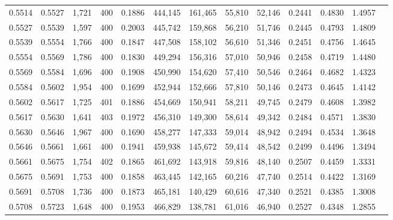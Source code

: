 \begin{tabular}{rrrrrrrrrrrrr}
0.5514 & 0.5527 &  1,721 & 400 &                                     0.1886 & 444,145 & 161,465 &  55,810 &  52,146 & 0.2441 & 0.4830 & 1.4957 \\
0.5527 & 0.5539 &  1,597 & 400 &                                     0.2003 & 445,742 & 159,868 &  56,210 &  51,746 & 0.2445 & 0.4793 & 1.4809 \\
0.5539 & 0.5554 &  1,766 & 400 &                                     0.1847 & 447,508 & 158,102 &  56,610 &  51,346 & 0.2451 & 0.4756 & 1.4645 \\
0.5554 & 0.5569 &  1,786 & 400 &                                     0.1830 & 449,294 & 156,316 &  57,010 &  50,946 & 0.2458 & 0.4719 & 1.4480 \\
0.5569 & 0.5584 &  1,696 & 400 &                                     0.1908 & 450,990 & 154,620 &  57,410 &  50,546 & 0.2464 & 0.4682 & 1.4323 \\
0.5584 & 0.5602 &  1,954 & 400 &                                     0.1699 & 452,944 & 152,666 &  57,810 &  50,146 & 0.2473 & 0.4645 & 1.4142 \\
0.5602 & 0.5617 &  1,725 & 401 &                                     0.1886 & 454,669 & 150,941 &  58,211 &  49,745 & 0.2479 & 0.4608 & 1.3982 \\
0.5617 & 0.5630 &  1,641 & 403 &                                     0.1972 & 456,310 & 149,300 &  58,614 &  49,342 & 0.2484 & 0.4571 & 1.3830 \\
0.5630 & 0.5646 &  1,967 & 400 &                                     0.1690 & 458,277 & 147,333 &  59,014 &  48,942 & 0.2494 & 0.4534 & 1.3648 \\
0.5646 & 0.5661 &  1,661 & 400 &                                     0.1941 & 459,938 & 145,672 &  59,414 &  48,542 & 0.2499 & 0.4496 & 1.3494 \\
0.5661 & 0.5675 &  1,754 & 402 &                                     0.1865 & 461,692 & 143,918 &  59,816 &  48,140 & 0.2507 & 0.4459 & 1.3331 \\
0.5675 & 0.5691 &  1,753 & 400 &                                     0.1858 & 463,445 & 142,165 &  60,216 &  47,740 & 0.2514 & 0.4422 & 1.3169 \\
0.5691 & 0.5708 &  1,736 & 400 &                                     0.1873 & 465,181 & 140,429 &  60,616 &  47,340 & 0.2521 & 0.4385 & 1.3008 \\
0.5708 & 0.5723 &  1,648 & 400 &                                     0.1953 & 466,829 & 138,781 &  61,016 &  46,940 & 0.2527 & 0.4348 & 1.2855 \\

\end{tabular}
